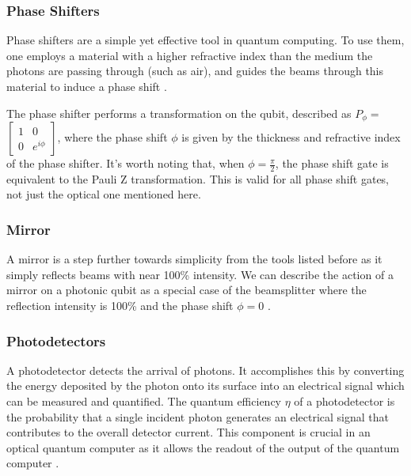 \subsubsection{Phase Shifters}
Phase shifters are a simple yet effective tool in quantum computing. To use them, one employs a material with a higher refractive index than the medium the photons are passing through (such as air), and guides the beams through this material to induce a phase shift \cite{nielsen_chuang_2010}. 

The phase shifter performs a transformation on the qubit, described as $P_\phi = $ $\begin{bmatrix}
1 & 0 \\
0 & e^{i\phi}
\end{bmatrix}$, where the phase shift $\phi$ is given by the thickness and refractive index of the phase shifter. It's worth noting that, when $\phi = \frac{\pi}{2}$, the phase shift gate is equivalent to the Pauli Z transformation. This is valid for all phase shift gates, not just the optical one mentioned here.

\subsubsection{Mirror}
A mirror is a step further towards simplicity from the tools listed before as it simply reflects beams with near 100\% intensity. We can describe the action of a mirror on a photonic qubit as a special case of the beamsplitter where the reflection intensity is 100\% and the phase shift $\phi = 0$  \cite{nielsen_chuang_2010}.

\subsubsection{Photodetectors}
A photodetector detects the arrival of photons. It accomplishes this by converting the energy deposited by the photon onto its surface into an electrical signal which can be measured and quantified. The quantum efficiency $\eta$ of a photodetector is the probability that a single incident photon generates an electrical signal that contributes to the overall detector current. This component is crucial in an optical quantum computer as it allows the readout of the output of the quantum computer \cite{nielsen_chuang_2010}. 


